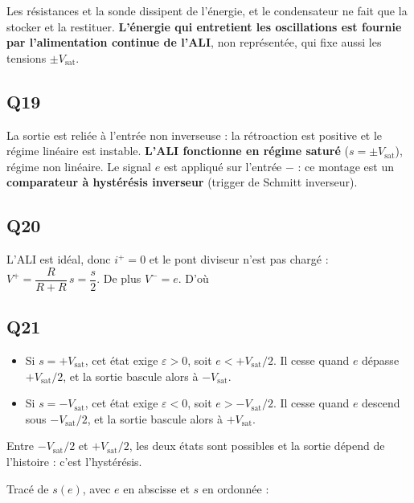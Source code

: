 \documentclass[11pt,a4paper]{article}
\providecommand{\tightlist}{\setlength{\itemsep}{0pt}\setlength{\parskip}{0pt}}
\newcommand{\equationajustee}[1]{%
  \sbox{\boiteequation}{$\displaystyle #1$}%
  \ifdim\wd\boiteequation>\linewidth
    \[\resizebox{\linewidth}{!}{\usebox{\boiteequation}}\]%
  \else
    \[#1\]%
  \fi}
\begin{document}
Les résistances et la sonde dissipent de l'énergie, et le condensateur ne fait que la stocker et la restituer. \textbf{L'énergie qui entretient les oscillations est fournie par l'alimentation continue de l'ALI}, non représentée, qui fixe aussi les tensions \(\pm V_{\text{sat}}\).

\hypertarget{q19}{%
\subsection{Q19}\label{q19}}

La sortie est reliée à l'entrée non inverseuse : la rétroaction est positive et le régime linéaire est instable. \textbf{L'ALI fonctionne en régime saturé} (\(s=\pm V_{\text{sat}}\)), régime non linéaire. Le signal \(e\) est appliqué sur l'entrée \(-\) : ce montage est un \textbf{comparateur à hystérésis inverseur} (trigger de Schmitt inverseur).

\hypertarget{q20}{%
\subsection{Q20}\label{q20}}

L'ALI est idéal, donc \(i^+=0\) et le pont diviseur n'est pas chargé : \(V^+=\dfrac{R}{R+R}\,s=\dfrac s2\). De plus \(V^-=e\). D'où

\equationajustee{\boxed{\varepsilon=\frac s2-e}}

\hypertarget{q21}{%
\subsection{Q21}\label{q21}}

\begin{itemize}
\tightlist
\item
  Si \(s=+V_{\text{sat}}\), cet état exige \(\varepsilon>0\), soit \(e<+V_{\text{sat}}/2\). Il cesse quand \(e\) dépasse \(+V_{\text{sat}}/2\), et la sortie bascule alors à \(-V_{\text{sat}}\).
\item
  Si \(s=-V_{\text{sat}}\), cet état exige \(\varepsilon<0\), soit \(e>-V_{\text{sat}}/2\). Il cesse quand \(e\) descend sous \(-V_{\text{sat}}/2\), et la sortie bascule alors à \(+V_{\text{sat}}\).
\end{itemize}

Entre \(-V_{\text{sat}}/2\) et \(+V_{\text{sat}}/2\), les deux états sont possibles et la sortie dépend de l'histoire : c'est l'hystérésis.

Tracé de \(s(e)\), avec \(e\) en abscisse et \(s\) en ordonnée :
\end{document}
